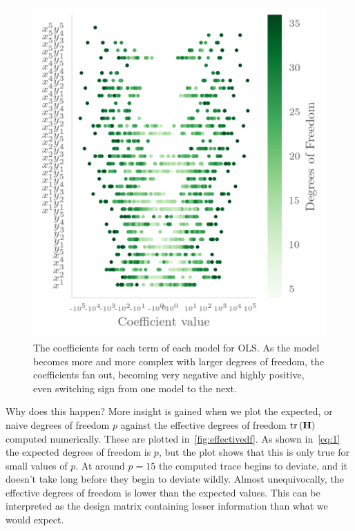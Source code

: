 \begin{figure}[]
  \centering
  \includegraphics[]{figures/olscoeff.png}
  \caption{\label{fig:olscoeff} The coefficients for each term of each model for
  OLS. As the model becomes more and more complex with larger degrees of
  freedom, the coefficients fan out, becoming very negative and highly positive,
even switching sign from one model to the next. }
\end{figure}

Why does this happen? More insight is gained when we plot the expected, or naive
degrees of freedom \(p\) against the effective degrees of freedom
\(\text{tr}\left(\vb{H}\right)\) computed numerically. These are plotted
in~\cref{fig:effectivedf}. As shown in~\cref{eq:1} the expected degrees of
freedom is \(p\), but the plot shows that this is only true for small values of
\(p\). At around \(p=15\) the computed trace begins to deviate, and it
doesn't take long before they begin to deviate wildly. Almost unequivocally, the
effective degrees of freedom is lower than the expected values. This can be
interpreted as the design matrix containing lesser information than what we
would expect.

